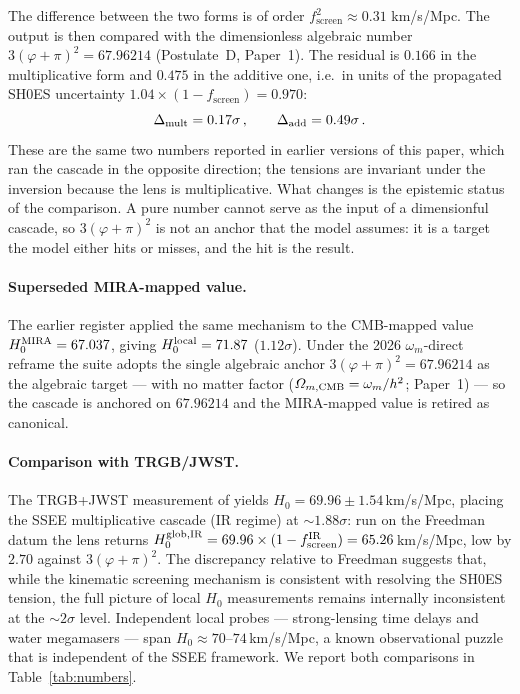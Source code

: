 \documentclass[12pt,a4paper]{article}
\newcommand{\phiG}{\varphi}
\newcommand{\fsc}{f_{\mathrm{screen}}}
\renewcommand{\Omega}{\varOmega}
\begin{document}
The difference between the two forms is of order $\fsc^2 \approx 0.31$ km/s/Mpc.
The output is then compared with the dimensionless algebraic number
$3(\phiG+\pi)^2 = 67.96214$ (Postulate~D, Paper~1). The residual is $0.166$ in
the multiplicative form and $0.475$ in the additive one, i.e.\ in units of the
propagated SH0ES uncertainty $1.04\times(1-\fsc) = 0.970$:
\begin{equation}
  \Delta_{\rm mult} = 0.17\sigma\,, \qquad \Delta_{\rm add} = 0.49\sigma\,.
  \label{eq:tensions}
\end{equation}
These are the same two numbers reported in earlier versions of this paper,
which ran the cascade in the opposite direction; the tensions are invariant
under the inversion because the lens is multiplicative. What changes is the
epistemic status of the comparison. A pure number cannot serve as the input of
a dimensionful cascade, so $3(\phiG+\pi)^2$ is not an anchor that the model
assumes: it is a target the model either hits or misses, and the hit is the
result.

\paragraph{Superseded MIRA-mapped value.}
The earlier register applied the same mechanism to the CMB-mapped value
$H_0^{\rm MIRA}=67.037$, giving $H_0^{\rm local}=71.87$ ($1.12\sigma$). Under
the 2026 $\omega_m$-direct reframe the suite adopts the single algebraic anchor
$3(\varphi+\pi)^2=67.96214$ as the algebraic target --- with no
matter factor ($\Omega_{m,\rm CMB}=\omega_m/h^2$; Paper~1) --- so the cascade is
anchored on $67.96214$ and the MIRA-mapped value is retired as canonical.

\paragraph{Comparison with TRGB/JWST.}
The TRGB+JWST measurement of \citet{Freedman2024} yields
$H_0 = 69.96\pm1.54$\,km/s/Mpc, placing the SSEE multiplicative
cascade (IR regime) at $\sim 1.88\sigma$: run on the Freedman datum the lens returns
$H_0^{\rm glob,IR} = 69.96\times(1-\fsc^{\rm IR}) = 65.26$\,km/s/Mpc, low by $2.70$
against $3(\phiG+\pi)^2$.
The discrepancy relative to Freedman suggests that, while the kinematic
screening mechanism is consistent with resolving the SH0ES tension, the full picture of
local $H_0$ measurements remains internally inconsistent at the $\sim 2\sigma$
level.  Independent local probes --- strong-lensing time delays
\citep{Wong2020} and water megamasers \citep{Pesce2020} --- span
$H_0 \approx 70$--$74$\,km/s/Mpc, a known observational puzzle that is
independent of the SSEE framework.
We report both comparisons in Table~\ref{tab:numbers}.
\end{document}
